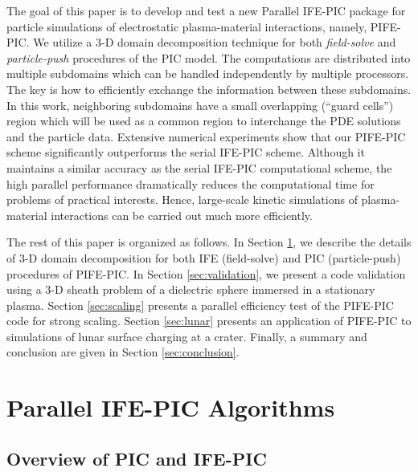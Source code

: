 \documentclass{siamart171218}
\begin{document}
The goal of this paper is to develop and test a new Parallel IFE-PIC package
for particle simulations of electrostatic plasma-material interactions,
namely, PIFE-PIC.
We utilize a 3-D domain decomposition technique
for both \emph{field-solve} and \emph{particle-push} procedures of the PIC model.
The computations are distributed into multiple subdomains
which can be handled independently by multiple processors.
The key is how to efficiently exchange the information between these subdomains.
In this work, neighboring subdomains have a small overlapping (``guard cells'') region
which will be used as a common region to interchange the PDE solutions and the particle data.
Extensive numerical experiments show that
our PIFE-PIC scheme significantly outperforms the serial IFE-PIC scheme.
Although it maintains a similar accuracy as the serial IFE-PIC computational scheme,
the high parallel performance dramatically reduces the computational time
for problems of practical interests.
Hence, large-scale kinetic simulations of plasma-material interactions
can be carried out much more efficiently.

The rest of this paper is organized as follows.
In Section \ref{sec:pifepic}, we describe the details of 3-D domain decomposition
for both IFE (field-solve) and PIC (particle-push) procedures of PIFE-PIC.
In Section \ref{sec:validation}, we present a code validation
using a 3-D sheath problem
of a dielectric sphere immersed in a stationary plasma.
Section \ref{sec:scaling} presents a parallel efficiency test of
the PIFE-PIC code for strong scaling.
Section \ref{sec:lunar} presents an application of PIFE-PIC
to simulations of lunar surface charging at a crater.
Finally, a summary and conclusion are given in Section \ref{sec:conclusion}.


\section{Parallel IFE-PIC Algorithms}
\label{sec:pifepic}


\subsection{Overview of PIC and IFE-PIC}
\end{document}
